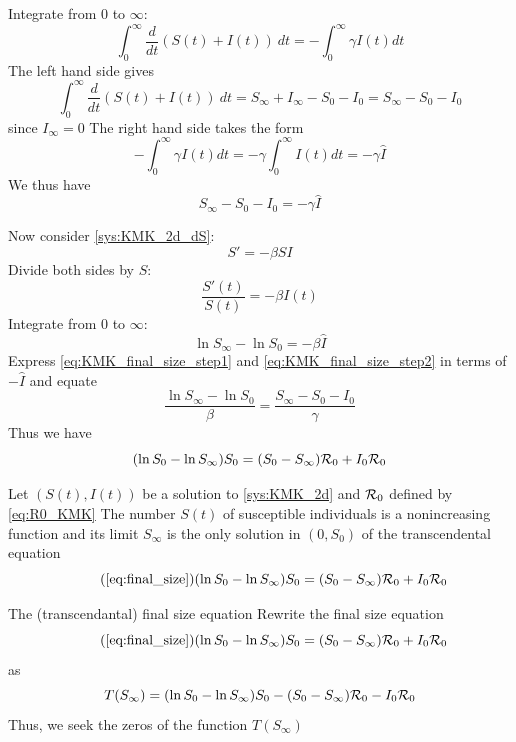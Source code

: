 \documentclass[aspectratio=169]{beamer}\usepackage[]{graphicx}\usepackage[]{xcolor}
\begin{document}
\begin{frame}{}
  Integrate from 0 to $\infty$:
  $$
  \int_0^\infty\frac{d}{dt}(S(t)+I(t))\ dt=-\int_0^\infty\gamma I(t)dt 
  $$
  The left hand side gives
  $$
  \int_0^\infty\frac{d}{dt}(S(t)+I(t))\ dt
  = S_\infty+I_\infty-S_0-I_0 = S_\infty-S_0-I_0
  $$
  since $I_\infty=0$
  \vfill
  The right hand side takes the form
  $$
  -\int_0^\infty\gamma I(t)dt = -\gamma\int_0^\infty I(t)dt = -\gamma \hat I
  $$
  We thus have
  \begin{equation}
  \label{eq:KMK_final_size_step1}
  S_\infty-S_0-I_0 = -\gamma\hat I
  \end{equation}
\end{frame}



\begin{frame}{}
  Now consider \eqref{sys:KMK_2d_dS}:
  $$
  S' = -\beta SI
  $$
  Divide both sides by $S$:
  $$
  \frac{S'(t)}{S(t)} = -\beta I(t)
  $$
  Integrate from 0 to $\infty$:
  \begin{equation}
  \label{eq:KMK_final_size_step2}
  \ln S_\infty-\ln S_0 = -\beta \hat I
  \end{equation}
  Express \eqref{eq:KMK_final_size_step1} and \eqref{eq:KMK_final_size_step2} in terms of $-\hat I$ and equate
  $$
  \frac{\ln S_\infty-\ln S_0}{\beta}
  =
  \frac{S_\infty-S_0-I_0}{\gamma}
  $$
  Thus we have
  \begin{equation}
  \label{eq:final_size}
  (\ln S_0-\ln S_\infty)S_0 = (S_0-S_\infty)\mathcal{R}_0+I_0\mathcal{R}_0
  \end{equation}
\end{frame}



\begin{frame}{}
\begin{theorem}
  Let $(S(t),I(t))$ be a solution to \eqref{sys:KMK_2d} and $\mathcal{R}_0$ defined by \eqref{eq:R0_KMK}
  \vskip0.5cm
  The number $S(t)$ of susceptible individuals is a nonincreasing function and its limit $S_\infty$ is the only solution in $(0,S_0)$ of the transcendental equation
  \begin{equation}\tag{\ref{eq:final_size}}
  (\ln S_0-\ln S_\infty)S_0 = (S_0-S_\infty)\R_0+I_0\R_0
  \end{equation}
\end{theorem}
\end{frame}



\begin{frame}{The (transcendantal) final size equation}
  Rewrite the final size equation
  \begin{equation}
    \tag{\ref{eq:final_size}}
  (\ln S_0-\ln S_\infty)S_0 = (S_0-S_\infty)\R_0+I_0\R_0
  \end{equation}
  as
  \begin{equation}
  \label{eq:final_size_2}
  T(S_\infty) =(\ln S_0-\ln S_\infty)S_0
  - (S_0-S_\infty)\mathcal{R}_0 -I_0\mathcal{R}_0
\end{equation}
\vfill
Thus, we seek the zeros of the function $T(S_\infty)$
\end{frame}
\end{document}
